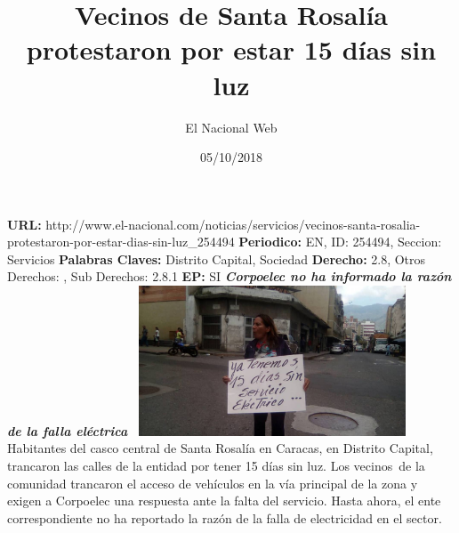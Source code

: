 \documentclass{article}%
\title{\textbf{Vecinos de Santa Rosalía protestaron por estar 15 días sin luz}}%
\author{El Nacional Web}%
\date{05/10/2018}%
\begin{document}
%
\normalsize%
\maketitle%
\textbf{URL: }%
http://www.el{-}nacional.com/noticias/servicios/vecinos{-}santa{-}rosalia{-}protestaron{-}por{-}estar{-}dias{-}sin{-}luz\_254494\newline%
%
\textbf{Periodico: }%
EN, %
ID: %
254494, %
Seccion: %
Servicios\newline%
%
\textbf{Palabras Claves: }%
Distrito Capital, Sociedad\newline%
%
\textbf{Derecho: }%
2.8, %
Otros Derechos: %
, %
Sub Derechos: %
2.8.1\newline%
%
\textbf{EP: }%
SI\newline%
\newline%
%
\textbf{\textit{Corpoelec no ha informado la razón de la falla eléctrica~}}%
\newline%
\newline%
%
\includegraphics[width=300px]{37.jpg}%
\newline%
%
Habitantes del casco central de Santa Rosalía en Caracas, en Distrito Capital, trancaron las calles de la entidad por tener 15 días sin luz.%
\newline%
%
Los vecinos~de la comunidad trancaron el acceso de vehículos en la vía principal de la zona y exigen a Corpoelec una respuesta ante la falta del servicio.%
\newline%
%
Hasta ahora, el ente correspondiente no ha reportado la razón de la falla de electricidad en el sector.%
\newline%
%
\end{document}
